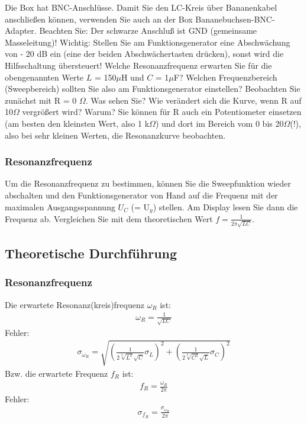 \documentclass[12pt]{scrartcl}
\begin{document}

Die Box hat BNC-Anschlüsse. Damit Sie den LC-Kreis über Bananenkabel anschließen können, verwenden Sie auch an der Box Bananebuchsen-BNC-Adapter. Beachten Sie: Der schwarze Anschluß ist GND (gemeinsame
Masseleitung)! Wichtig: Stellen Sie am Funktionsgenerator eine Abschwächung von - 20 dB ein (eine der beiden Abschwächertasten drücken), sonst wird die Hilfsschaltung übersteuert! Welche Resonanzfrequenz erwarten Sie für die obengenannten Werte
$L$ = 150$\mu$H und $C$ = 1$\mu$F? Welchen Frequenzbereich (Sweepbereich) sollten Sie also am Funktionsgenerator einstellen?
Beobachten Sie zunächst mit R = 0
$\Omega$. Was sehen Sie? Wie verändert sich die Kurve, wenn R auf 10$\Omega$ vergrößert wird? Warum? Sie können für R auch ein Potentiometer einsetzen (am besten den kleinsten Wert, also 1 k$\Omega$) und dort im Bereich vom 0 bis 20$\Omega$(!), also bei sehr kleinen Werten, die Resonanzkurve beobachten.
\subsubsection{Resonanzfrequenz}
Um die Resonanzfrequenz zu bestimmen, können Sie die Sweepfunktion wieder abschalten und den Funktionsgenerator von Hand auf die Frequenz mit der maximalen Ausgangsspannung
$U_C$ (= U$_y$) stellen. Am Display lesen Sie dann die Frequenz ab. Vergleichen Sie mit dem theoretischen Wert
$f = \frac{1}{2 \pi \sqrt{LC}}$.
\subsection{Theoretische Durchführung}
\subsubsection{Resonanzfrequenz}
Die erwartete Resonanz(kreis)frequenz $\omega_R$ ist:
\begin{align}
\omega_R = \frac{1}{\sqrt{LC}}
\end{align}
Fehler:
\begin{align}
\sigma_{\omega_R} = \sqrt{
\left(\frac{1}{2\sqrt[3]{L^2}\sqrt{C}}\sigma_L\right)^2+
\left(\frac{1}{2\sqrt[3]{C^2}\sqrt{L}}\sigma_C\right)^2}
\end{align}
Bzw. die erwartete Frequenz $f_R$ ist:
\begin{align}
f_R = \frac{\omega_R}{2\pi}
\end{align}
Fehler:
\begin{align}
\sigma_{f_R} = \frac{\sigma_{\omega_R}}{2 \pi}
\end{align}
\end{document}

